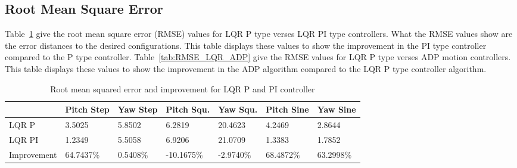 \subsection{Root Mean Square Error}
Table~\ref{tab:RMSE_P_PI} give the root mean square error (RMSE) values for LQR P type verses LQR PI type controllers.  What the RMSE values show are the error distances to the desired configurations.  This table displays these values to show the improvement in the PI type controller compared to the P type controller.  Table~\ref{tab:RMSE_LQR_ADP} give the RMSE values for LQR P type verses ADP motion controllers.  This table displays these values to show the improvement in the ADP algorithm compared to the LQR P type controller algorithm.

\begin{table}
    \centering
    \begin{tabular}{l|l|l|l|l|l|l}
        \toprule
        \textbf{} & \textbf{Pitch Step} & \textbf{Yaw Step} & \textbf{Pitch Squ.} & \textbf{Yaw Squ.} & \textbf{Pitch Sine} & \textbf{Yaw Sine}\\
        \toprule
        LQR P & 3.5025 & 5.8502 & 6.2819 & 20.4623 & 4.2469 & 2.8644\\
        LQR PI & 1.2349 & 5.5058 & 6.9206 & 21.0709 & 1.3383 & 1.7852\\
        Improvement & 64.7437\% & 0.5408\% & -10.1675\% & -2.9740\% & 68.4872\% & 63.2998\% \\
    \end{tabular}
    \caption{Root mean squared error and improvement for LQR P and PI controller}
    \label{tab:RMSE_P_PI}
\end{table}

